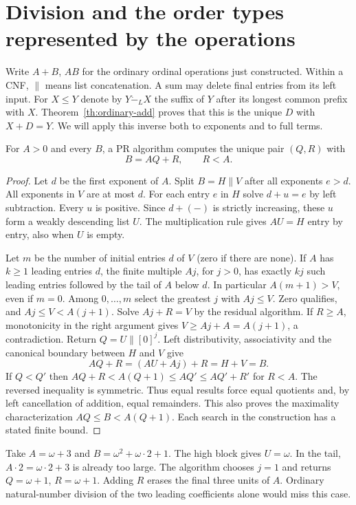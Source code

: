 \section{Division and the order types represented by the operations}
\label{sec:division}
Write $A+B$, $AB$ for the ordinary ordinal operations just constructed. Within a CNF, $\|$ means list concatenation. A sum may delete final entries from its left input.
For $X\le Y$ denote by $Y\mathbin{\dot-}_{\!L}X$ the suffix of $Y$ after its longest common prefix with $X$. Theorem~\ref{th:ordinary-add} proves that this is the unique $D$ with $X+D=Y$. We will apply this inverse both to exponents and to full terms.
\begin{theorem}\label{thm:orddiv}
For $A>0$ and every $B$, a PR algorithm computes the unique pair $(Q,R)$ with
\[
 B=AQ+R,\qquad R<A .
\]
\end{theorem}
\begin{proof}
Let $d$ be the first exponent of $A$. Split $B=H\|V$ after all exponents $e>d$. All exponents in $V$ are at most $d$. For each entry $e$ in $H$ solve $d+u=e$ by left subtraction. Every $u$ is positive. Since $d+(-)$ is strictly increasing, these $u$ form a weakly descending list $U$. The multiplication rule gives $AU=H$ entry by entry, also when $U$ is empty.

Let $m$ be the number of initial entries $d$ of $V$ (zero if there are none). If $A$ has $k\ge1$ leading entries $d$, the finite multiple $A j$, for $j>0$, has exactly $kj$ such leading entries followed by the tail of $A$ below $d$. In particular $A(m+1)>V$, even if $m=0$. Among $0,\ldots,m$ select the greatest $j$ with $Aj\le V$. Zero qualifies, and
$Aj\le V<A(j+1)$. Solve $Aj+R=V$ by the residual algorithm. If $R\ge A$, monotonicity in the right argument gives $V\ge Aj+A=A(j+1)$, a contradiction. Return $Q=U\|[0]^j$. Left distributivity, associativity and the canonical boundary between $H$ and $V$ give
\[
 AQ+R=(AU+Aj)+R=H+V=B.
\]
If $Q<Q'$ then $AQ+R<A(Q+1)\le AQ'\le AQ'+R'$ for $R<A$. The reversed inequality is symmetric. Thus equal results force equal quotients and, by left cancellation of addition, equal remainders. This also proves the maximality characterization $AQ\le B<A(Q+1)$. Each search in the construction has a stated finite bound.
\end{proof}
\begin{example}
Take $A=\omega+3$ and $B=\omega^2+\omega\cdot2+1$. The high block gives $U=\omega$. In the tail, $A\cdot2=\omega\cdot2+3$ is already too large. The algorithm chooses $j=1$ and returns $Q=\omega+1$, $R=\omega+1$. Adding $R$ erases the final three units of $A$. Ordinary natural-number division of the two leading coefficients alone would miss this case.
\end{example}
